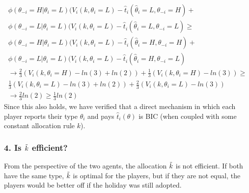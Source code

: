 \documentclass[a4paper]{article}
\begin{document}
	\begin{align}
		\phi(\theta_{-i}=H|\theta_{i}=L)(V_{i}(k,\theta_{i}=L)-\hat{t}_{i}(\hat{\theta}_{i}=L,\theta_{-i}=H) + \nonumber \\\phi(\theta_{-i}=L|\theta_{i}=L)(V_{i}(k,\theta_{i}=L)-\hat{t}_{i}(\hat{\theta}_{i}=L,\theta_{-i}=L) \geq \nonumber\\
		\phi(\theta_{-i}=H|\theta_{i}=L)(V_{i}(k,\theta_{i}=L)-\hat{t}_{i}(\hat{\theta}_{i}=H,\theta_{-i}=H) + \nonumber \\\phi(\theta_{-i}=L|\theta_{i}=L)(V_{i}(k,\theta_{i}=L)-\hat{t}_{i}(\hat{\theta}_{i}=H,\theta_{-i}=L)\\
		\rightarrow \frac{2}{3}(V_{i}(k,\theta_{i}=H)-ln(3)+ln(2))+\frac{1}{3}(V_{i}(k,\theta_{i}=H)-ln(3)) \geq \nonumber\\ \frac{1}{3}(V_{i}(k,\theta_{i}=L)-ln(3)+ln(2))+\frac{2}{3}(V_{i}(k,\theta_{i}=L)-ln(3))\\
		\rightarrow \frac{2}{3}ln(2) \geq \frac{1}{3}ln(2)
	\end{align}
	Since this also holds, we have verified that a direct mechanism in which each player reports their type $\theta_{i}$ and pays $\hat{t}_{i}(\theta)$ is BIC (when
	coupled with some constant allocation rule $k$).
	
	
	\subsubsection*{4. Is $\Tilde{k}$ efficient?}
	From the perspective of the two agents, the allocation $\Tilde{k}$ is not efficient. If both have the same type, $\Tilde{k}$ is optimal for the players, but if they are not equal, the players would be better off if the holiday was still adopted.
	
	
\end{document}
